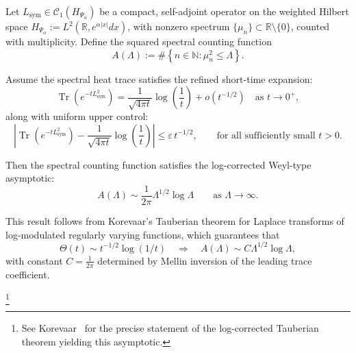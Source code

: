 \begin{lemma}
\label{lem:log-corrected-tauberian-application}
Let \( L_{\mathrm{sym}} \in \mathcal{C}_1(H_{\Psi_\alpha}) \) be a compact, self-adjoint operator on the weighted Hilbert space \( H_{\Psi_\alpha} := L^2(\mathbb{R}, e^{\alpha |x|} dx) \), with nonzero spectrum \( \{ \mu_n \} \subset \mathbb{R} \setminus \{0\} \), counted with multiplicity. Define the squared spectral counting function
\[
A(\Lambda) := \#\left\{ n \in \mathbb{N} : \mu_n^2 \le \Lambda \right\}.
\]

Assume the spectral heat trace satisfies the refined short-time expansion:
\[
\operatorname{Tr}(e^{-t L_{\mathrm{sym}}^2}) = \frac{1}{\sqrt{4\pi t}} \log\left( \frac{1}{t} \right) + o(t^{-1/2})
\quad \text{as } t \to 0^+,
\]
along with uniform upper control:
\[
\left| \operatorname{Tr}(e^{-t L_{\mathrm{sym}}^2}) - \frac{1}{\sqrt{4\pi t}} \log\left( \frac{1}{t} \right) \right| \le \varepsilon\, t^{-1/2},
\qquad \text{for all sufficiently small } t > 0.
\]

Then the spectral counting function satisfies the log-corrected Weyl-type asymptotic:
\[
A(\Lambda) \sim \frac{1}{2\pi} \Lambda^{1/2} \log \Lambda \qquad \text{as } \Lambda \to \infty.
\]

\medskip
\noindent
This result follows from Korevaar’s Tauberian theorem for Laplace transforms of log-modulated regularly varying functions, which guarantees that
\[
\Theta(t) \sim t^{-1/2} \log(1/t) \quad \Rightarrow \quad
A(\Lambda) \sim C \Lambda^{1/2} \log \Lambda,
\]
with constant \( C = \frac{1}{2\pi} \) determined by Mellin inversion of the leading trace coefficient.

\footnote{See Korevaar~\cite[Chapter~III, §5, Theorem~5.5]{Korevaar2004Tauberian} for the precise statement of the log-corrected Tauberian theorem yielding this asymptotic.}
\end{lemma}
